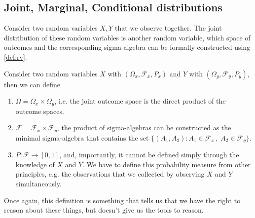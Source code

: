 \subsection{Joint, Marginal, Conditional distributions}

Consider two random variables $X,Y$ that we observe together.
The joint distribution of these random variables is another random variable, which space of outcomes and the corresponding sigma-algebra can be formally constructed using \cref{def:rv}.

\begin{mybox}
\begin{definition}\label{def:joint_dist}
    Consider two random variables $X$ with $(\Omega_x, \mathcal{F}_x, P_x)$ and $Y$ with $(\Omega_y, \mathcal{F}_y, P_y)$, then we can define
    \begin{enumerate}
        \item $\Omega = \Omega_x \times \Omega_y$, i.e. the joint outcome space is the direct product of the outcome spaces.
        \item $\mathcal{F} = \mathcal{F}_x \times \mathcal{F}_y$, the product of sigma-algebras can be constructed as the minimal sigma-algebra that contains the set $\{(A_1, A_2): A_1 \in \mathcal{F}_x\,,\; A_2 \in \mathcal{F}_y\}$.
        \item $P: \mathcal{F} \to [0,1]$, and, importantly, it cannot be defined simply through the knowledge of $X$ and $Y$. We have to define this probability measure from other principles, e.g. the observations that we collected by observing $X$ and $Y$ simultaneously.
    \end{enumerate}
\end{definition}
\end{mybox}
Once again, this definition is something that tells us that we have the right to reason about these things, but doesn't give us the tools to reason.

